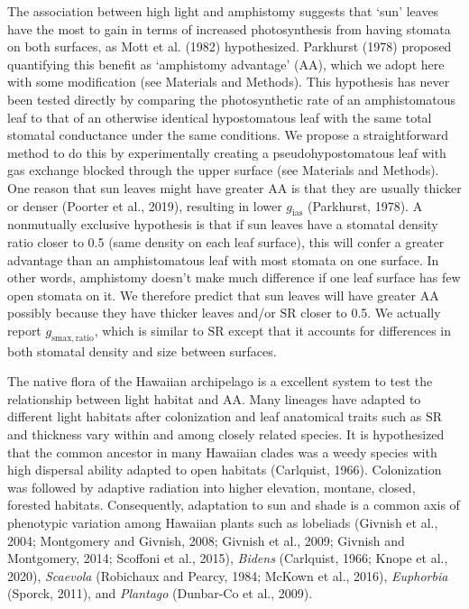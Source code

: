\documentclass[
  letterpaper,
  DIV=11,
  numbers=noendperiod]{scrartcl}
\begin{document}
The association between high light and amphistomy suggests that `sun'
leaves have the most to gain in terms of increased photosynthesis from
having stomata on both surfaces, as Mott et al. (1982) hypothesized.
Parkhurst (1978) proposed quantifying this benefit as `amphistomy
advantage' (\(\mathrm{AA}\)), which we adopt here with some modification
(see Materials and Methods). This hypothesis has never been tested
directly by comparing the photosynthetic rate of an amphistomatous leaf
to that of an otherwise identical hypostomatous leaf with the same total
stomatal conductance under the same conditions. We propose a
straightforward method to do this by experimentally creating a
pseudohypostomatous leaf with gas exchange blocked through the upper
surface (see Materials and Methods). One reason that sun leaves might
have greater \(\mathrm{AA}\) is that they are usually thicker or denser
(Poorter et al., 2019), resulting in lower \(g_\mathrm{ias}\)
(Parkhurst, 1978). A nonmutually exclusive hypothesis is that if sun
leaves have a stomatal density ratio closer to 0.5 (same density on each
leaf surface), this will confer a greater advantage than an
amphistomatous leaf with most stomata on one surface. In other words,
amphistomy doesn't make much difference if one leaf surface has few open
stomata on it. We therefore predict that sun leaves will have greater
\(\mathrm{AA}\) possibly because they have thicker leaves and/or
\(\mathrm{SR}\) closer to 0.5. We actually report
\(g_{\mathrm{smax,ratio}}\), which is similar to \(\mathrm{SR}\) except
that it accounts for differences in both stomatal density and size
between surfaces.

The native flora of the Hawaiian archipelago is a excellent system to
test the relationship between light habitat and \(\mathrm{AA}\). Many
lineages have adapted to different light habitats after colonization and
leaf anatomical traits such as \(\mathrm{SR}\) and thickness vary within
and among closely related species. It is hypothesized that the common
ancestor in many Hawaiian clades was a weedy species with high dispersal
ability adapted to open habitats (Carlquist, 1966). Colonization was
followed by adaptive radiation into higher elevation, montane, closed,
forested habitats. Consequently, adaptation to sun and shade is a common
axis of phenotypic variation among Hawaiian plants such as lobeliads
(Givnish et al., 2004; Montgomery and Givnish, 2008; Givnish et al.,
2009; Givnish and Montgomery, 2014; Scoffoni et al., 2015),
\emph{Bidens} (Carlquist, 1966; Knope et al., 2020), \emph{Scaevola}
(Robichaux and Pearcy, 1984; McKown et al., 2016), \emph{Euphorbia}
(Sporck, 2011), and \emph{Plantago} (Dunbar-Co et al., 2009).
\end{document}
